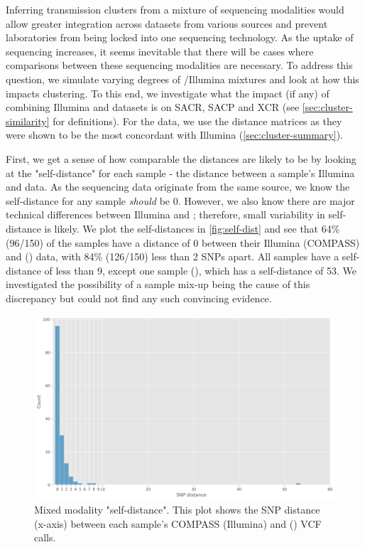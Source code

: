 Inferring transmission clusters from a mixture of sequencing modalities would allow greater integration across datasets from various sources and prevent laboratories from being locked into one sequencing technology. As the uptake of \ont{} sequencing increases, it seems inevitable that there will be cases where comparisons between these sequencing modalities are necessary. To address this question, we simulate varying degrees of \ont{}/Illumina mixtures and look at how this impacts clustering. To this end, we investigate what the impact (if any) of combining Illumina and \ont{} datasets is on SACR, SACP and XCR (see \autoref{sec:cluster-similarity} for definitions). For the \ont{} data, we use the \bcftools{} distance matrices as they were shown to be the most concordant with Illumina (\autoref{sec:cluster-summary}).

First, we get a sense of how comparable the distances are likely to be by looking at the "self-distance" for each sample - the distance between a sample's Illumina and \ont{} data.  As the sequencing data originate from the same source, we know the self-distance for any sample \emph{should} be 0. However, we also know there are major technical differences between Illumina and \ont{}; therefore, small variability in self-distance is likely. We plot the self-distances in \autoref{fig:self-dist} and see that 64\% (96/150) of the samples have a distance of 0 between their Illumina (COMPASS) and \ont{} (\bcftools{}) data, with 84\% (126/150) less than 2 SNPs apart. All samples have a self-distance of less than 9, except one sample (), which has a self-distance of 53. We investigated the possibility of a sample mix-up being the cause of this discrepancy but could not find any such convincing evidence. 

\begin{figure}
\begin{center}
\includegraphics[width=0.90\columnwidth]{Chapter2/Figs/mixed_self_dist.png}
\caption{{Mixed modality "self-distance". This plot shows the SNP distance (x-axis) between each sample's COMPASS (Illumina) and \bcftools{} (\ont{}) VCF calls.
\label{fig:self-dist}
}}
\end{center}
\end{figure}

